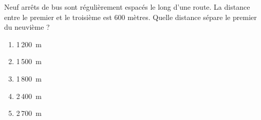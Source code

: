 Neuf arrêts de bus sont régulièrement espacés le long d'une route. La distance entre le premier et le troisième est 600 mètres. Quelle distance sépare le premier du neuvième ?
\begin{multicols}{5}
  \begin{enumerate}[A/]
  \item 1\,200~m
  \item 1\,500~m
  \item 1\,800~m
  \item 2\,400~m
  \item 2\,700~m
  \end{enumerate}
\end{multicols}